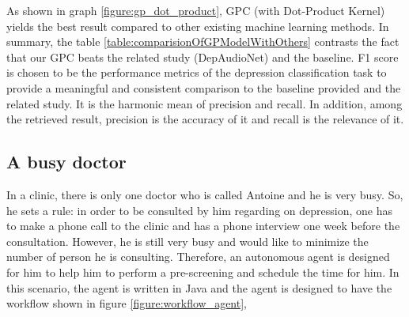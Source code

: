 \documentclass{article}
\begin{document}
 	    
        \begin{table}[h!]
            \begin{center}
            \end{center}
        \caption{Our GPC beats the related study (DepAudioNet) and the baseline.}
        \label{table:comparisionOfGPModelWithOthers}
        \end{table}

        As shown in graph \ref{figure:gp_dot_product}, GPC (with Dot-Product Kernel) yields the best result compared to other existing machine learning methods. 
        In summary, the table \ref{table:comparisionOfGPModelWithOthers} contrasts the fact that our GPC beats the related study (DepAudioNet) and the baseline.
        F1 score is chosen to be the performance metrics of the depression classification task to provide a meaningful and consistent comparison to the baseline 
        provided and the related study. It is the harmonic mean of precision and recall. 
        In addition, among the retrieved result, precision is the accuracy of it and recall is the relevance of it.

	\subsection{A busy doctor}
	In a clinic, there is only one doctor who is called Antoine and he is very busy. 
	So, he sets a rule: in order to be consulted by him regarding on depression, 
	one has to make a phone call to the clinic and has a phone interview one week before the consultation. 
	However, he is still very busy and would like to minimize the number of person he is consulting. 
	Therefore, an autonomous agent is designed for him to help him to perform a pre-screening and schedule the time for him.
	In this scenario, the agent is written in Java and the agent is designed to have the workflow shown in figure \ref{figure:workflow_agent},
\end{document}
